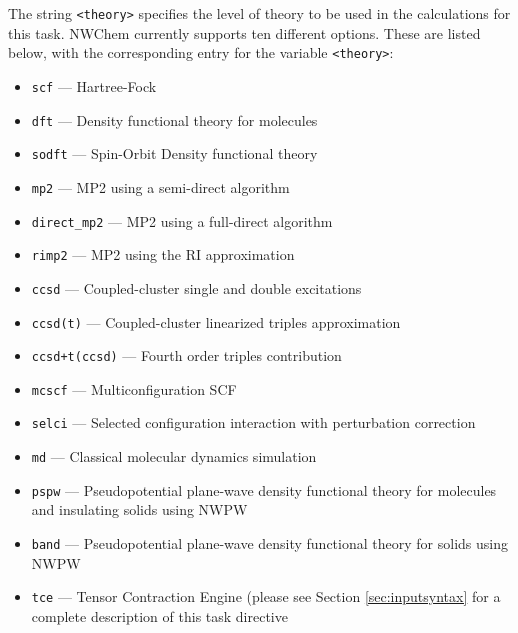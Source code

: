 The string \verb+<theory>+ specifies the level of theory to be used in the
calculations for this task.  NWChem currently supports ten different
options.  These are listed below, with the corresponding entry for 
the variable {\tt <theory>}:
\begin{itemize}
 \item \verb+scf+ --- Hartree-Fock
 \item \verb+dft+ --- Density functional theory for molecules
 \item \verb+sodft+ --- Spin-Orbit Density functional theory
 \item \verb+mp2+ --- MP2 using a semi-direct algorithm
 \item \verb+direct_mp2+ --- MP2 using a full-direct algorithm
 \item \verb+rimp2+ --- MP2 using the RI approximation
 \item \verb+ccsd+ --- Coupled-cluster single and double excitations
 \item \verb+ccsd(t)+ --- Coupled-cluster linearized triples approximation
 \item \verb#ccsd+t(ccsd)# --- Fourth order triples contribution
 \item \verb+mcscf+ --- Multiconfiguration SCF
 \item \verb+selci+ --- Selected configuration interaction with perturbation
   correction 
 \item \verb+md+ --- Classical molecular dynamics simulation 
 \item \verb+pspw+ --- Pseudopotential plane-wave density functional theory for molecules and insulating solids using NWPW
 \item \verb+band+ --- Pseudopotential plane-wave 
density functional theory for solids using NWPW
 \item \verb+tce+ --- Tensor Contraction Engine (please see
Section \ref{sec:inputsyntax} for a complete description of this task directive

\end{itemize}

